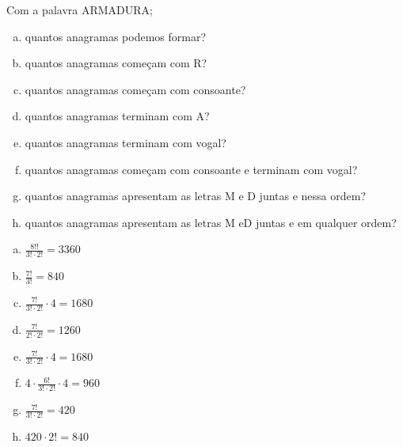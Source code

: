 \begin{ex}
Com a palavra ARMADURA;
   \begin{enumerate}[(a)]
   \item quantos anagramas podemos formar?
   \item quantos anagramas começam com R?
   \item quantos anagramas começam com consoante?
   \item quantos anagramas terminam com A?
   \item quantos anagramas terminam com vogal?
   \item quantos anagramas começam com consoante e terminam com vogal?
   \item quantos anagramas apresentam as letras M e D juntas e nessa ordem?
   \item quantos anagramas apresentam as letras M eD juntas e em qualquer ordem?
   \end{enumerate}
     \begin{sol}
         \phantom{A}
         \begin{enumerate}   [(a)]
             \item $\frac{8!!}{3!\cdot2!}=3360$
             \item $\frac{7!}{3!}=840$
             \item $\frac{7!}{3!\cdot2!}\cdot4=1680$
             \item $\frac{7!}{2!\cdot2!}=1260$
             \item $\frac{7!}{3!\cdot2!}\cdot4=1680$
             \item $4\cdot\frac{6!}{3!\cdot2!}\cdot4=960$
             \item $\frac{7!}{3!\cdot2!}=420$
             \item $420\cdot2!=840$
         \end{enumerate}
     \end{sol}
\end{ex}